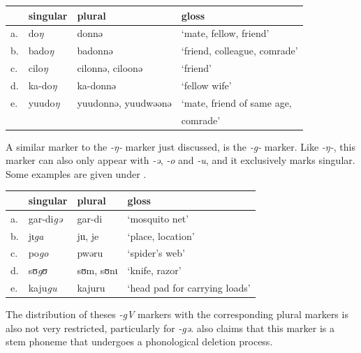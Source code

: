 \begin{exe}
    \ex \label{except-ng3}
    \begin{tabular}[t]{llll}
      & singular        & plural              & gloss                               \\
      \midrule
      a. & do\textit{ŋ}    & donnə               & `mate, fellow, friend'             \\
      b. & bado\textit{ŋ}  & badonnə             & `friend, colleague, comrade'        \\
      c. & cilo\textit{ŋ}  & cilonnə, ciloonə    & `friend'                            \\
      d. & ka-do\textit{ŋ} & ka-donnə            & `fellow wife'                       \\
      e. & yuudo\textit{ŋ} & yuudonnə, yuudwəənə & `mate, friend of same age, \\
      &&& comrade' \\
    \end{tabular}
\end{exe}

A similar marker to the \textit{-ŋ-} marker just discussed, is the \textit{-g-} marker. Like \textit{-ŋ-}, this marker can also only appear with \textit{-ə}, \textit{-o} and \textit{-u}, and it exclusively marks singular. Some examples are given under .

\begin{exe}
    \ex \label{g-exe-kasem}
    \begin{tabular}[t]{llll}
      & singular & plural    & gloss                         \\
      \midrule
      a. & gar-di\textit{gə} & gar-di    & `mosquito net'                \\
      b. & jɩ\textit{ga}     & jɩɩ, je      & `place, location'          \\
      c. & po\textit{go}     & pwəru     & `spider's web'                \\
      d. & sʊ\textit{gʊ}     & sʊm, sʊnɩ & `knife, razor'                \\
      e. & kaju\textit{gu}   & kajuru    & `head pad for carrying loads' \\
    \end{tabular}
\end{exe}

The distribution of theses \textit{-gV} markers with the corresponding plural markers is also not very restricted, particularly for \textit{-gə}. \textcites{Callow.1965} also claims that this marker is a stem phoneme that undergoes a phonological deletion process.

